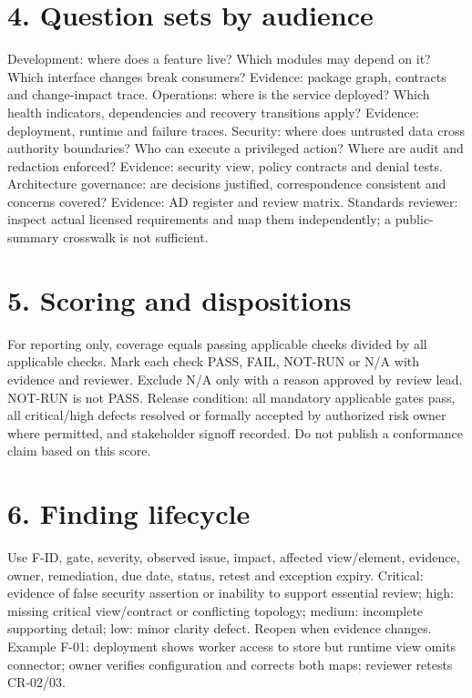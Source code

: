 \documentclass[11pt,letterpaper]{article}
\begin{document}
\section*{4. Question sets by audience}
Development: where does a feature live? Which modules may depend on it? Which interface changes break consumers? Evidence: package graph, contracts and change-impact trace. Operations: where is the service deployed? Which health indicators, dependencies and recovery transitions apply? Evidence: deployment, runtime and failure traces. Security: where does untrusted data cross authority boundaries? Who can execute a privileged action? Where are audit and redaction enforced? Evidence: security view, policy contracts and denial tests. Architecture governance: are decisions justified, correspondence consistent and concerns covered? Evidence: AD register and review matrix. Standards reviewer: inspect actual licensed requirements and map them independently; a public-summary crosswalk is not sufficient.\par\smallskip
\section*{5. Scoring and dispositions}
For reporting only, coverage equals passing applicable checks divided by all applicable checks. Mark each check PASS, FAIL, NOT-RUN or N/A with evidence and reviewer. Exclude N/A only with a reason approved by review lead. NOT-RUN is not PASS. Release condition: all mandatory applicable gates pass, all critical/high defects resolved or formally accepted by authorized risk owner where permitted, and stakeholder signoff recorded. Do not publish a conformance claim based on this score.\par\smallskip
\section*{6. Finding lifecycle}
Use F-ID, gate, severity, observed issue, impact, affected view/element, evidence, owner, remediation, due date, status, retest and exception expiry. Critical: evidence of false security assertion or inability to support essential review; high: missing critical view/contract or conflicting topology; medium: incomplete supporting detail; low: minor clarity defect. Reopen when evidence changes. Example F-01: deployment shows worker access to store but runtime view omits connector; owner verifies configuration and corrects both maps; reviewer retests CR-02/03.\par\smallskip
\end{document}
